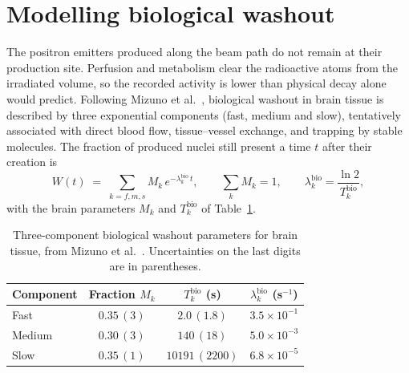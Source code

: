 \documentclass[11pt]{article}
\begin{document}
\section{Modelling biological washout}
\label{sec:washout}

The positron emitters produced along the beam path do not remain at their
production site. Perfusion and metabolism clear the radioactive atoms from the
irradiated volume, so the recorded activity is lower than physical decay alone
would predict. Following Mizuno et al.~\cite{Mizuno2003}, biological washout in
brain tissue is described by three exponential components (fast, medium and
slow), tentatively associated with direct blood flow, tissue--vessel exchange,
and trapping by stable molecules. The fraction of produced nuclei still present
a time $t$ after their creation is
%
\begin{equation}
  W(t) \;=\; \sum_{k=f,m,s} M_k\, e^{-\lambda_k^{\mathrm{bio}}\,t},
  \qquad \sum_{k} M_k = 1,
  \qquad \lambda_k^{\mathrm{bio}} = \frac{\ln 2}{T_k^{\mathrm{bio}}},
  \label{eq:washout}
\end{equation}
%
with the brain parameters $M_k$ and $T_k^{\mathrm{bio}}$ of
Table~\ref{tab:washout_brain}.

\begin{table}[ht]
  \centering
  \begin{tabular}{lccc}
    \hline
    Component & Fraction $M_k$ & $T_k^{\mathrm{bio}}$ (s) &
      $\lambda_k^{\mathrm{bio}}$ (s$^{-1}$) \\
    \hline
    Fast   & $0.35\,(3)$ & $2.0\,(1.8)$    & $3.5\times10^{-1}$ \\
    Medium & $0.30\,(3)$ & $140\,(18)$     & $5.0\times10^{-3}$ \\
    Slow   & $0.35\,(1)$ & $10191\,(2200)$ & $6.8\times10^{-5}$ \\
    \hline
  \end{tabular}
  \caption{Three-component biological washout parameters for brain tissue,
  from Mizuno et al.~\cite{Mizuno2003}. Uncertainties on the last digits are
  in parentheses.}
  \label{tab:washout_brain}
\end{table}
\end{document}
